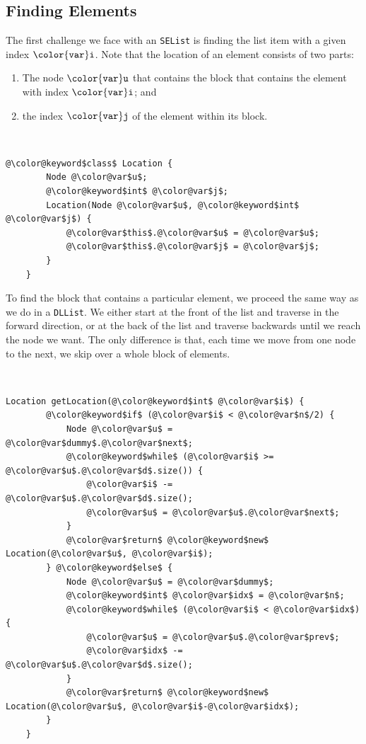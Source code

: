 \documentclass[10pt]{book}
\newcommand{\pcodeimport}[1]{}
\theoremstyle{plain}
\theoremstyle{definition}
\begin{document}
\subsection{Finding Elements}

The first challenge we face with an \texttt{SEList} is finding the list item
with a given index \ensuremath{\mathtt{{\color{var}i}}}.  Note that the location of an element consists
of two parts: 
\begin{enumerate}
  \item The node \ensuremath{\mathtt{{\color{var}u}}} that contains the block that contains the element
  with index \ensuremath{\mathtt{{\color{var}i}}}; and
  \item the index \ensuremath{\mathtt{{\color{var}j}}} of the element within its block.
\end{enumerate}



 \ \vspace{.5ex}\begin{Verbatim}[gobble=1,tabsize=2,frame=single,framerule=1.2pt,commandchars=\\@\$,label=\texttt{SEList},labelposition=topline]
	@\color@keyword$class$ Location {
		Node @\color@var$u$;
		@\color@keyword$int$ @\color@var$j$;
		Location(Node @\color@var$u$, @\color@keyword$int$ @\color@var$j$) {
			@\color@var$this$.@\color@var$u$ = @\color@var$u$;
			@\color@var$this$.@\color@var$j$ = @\color@var$j$;
		}
	}
\end{Verbatim}


To find the block that contains a particular element, we proceed the same
way as we do in a \texttt{DLList}.  We either start at the front of the list and
traverse in the forward direction, or at the back of the list and traverse
backwards until we reach the node we want.  The only difference is that,
each time we move from one node to the next, we skip over a whole block
of elements.

\pcodeimport{ods/SEList.get_location(i)}


 \ \vspace{.5ex}\begin{Verbatim}[gobble=1,tabsize=2,frame=single,framerule=1.2pt,commandchars=\\@\$,label=\texttt{SEList},labelposition=topline]
	Location getLocation(@\color@keyword$int$ @\color@var$i$) {
		@\color@keyword$if$ (@\color@var$i$ < @\color@var$n$/2) {
			Node @\color@var$u$ = @\color@var$dummy$.@\color@var$next$;
			@\color@keyword$while$ (@\color@var$i$ >= @\color@var$u$.@\color@var$d$.size()) {
				@\color@var$i$ -= @\color@var$u$.@\color@var$d$.size();
				@\color@var$u$ = @\color@var$u$.@\color@var$next$;
			}
			@\color@var$return$ @\color@keyword$new$ Location(@\color@var$u$, @\color@var$i$);
		} @\color@keyword$else$ {
			Node @\color@var$u$ = @\color@var$dummy$;
			@\color@keyword$int$ @\color@var$idx$ = @\color@var$n$;
			@\color@keyword$while$ (@\color@var$i$ < @\color@var$idx$) {
				@\color@var$u$ = @\color@var$u$.@\color@var$prev$;
				@\color@var$idx$ -= @\color@var$u$.@\color@var$d$.size();
			}
			@\color@var$return$ @\color@keyword$new$ Location(@\color@var$u$, @\color@var$i$-@\color@var$idx$);
		}
	}
\end{Verbatim}
\end{document}
